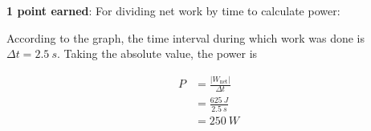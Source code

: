 \documentclass[answers]{exam}
\begin{document}
\begin{questions}
\begin{solutionorbox}[12cm]
\textbf{\color{red} 1 point earned}: For dividing net work by time to calculate power:

According to the graph, the time interval during which work was done is $\Delta t = \SI{2.5}{s}$. Taking the absolute value, the power is

\begin{align*}
    P &= \frac{\left|W_\mathrm{net}\right|}{\Delta t} \\[1ex]
    &= \frac{\SI{625}{J}}{\SI{2.5}{s}} \\[1ex]
    &= \boxed{\SI{250}{W}}
\end{align*}
\end{solutionorbox}
\fi
{} 





\end{questions}
\end{document}
